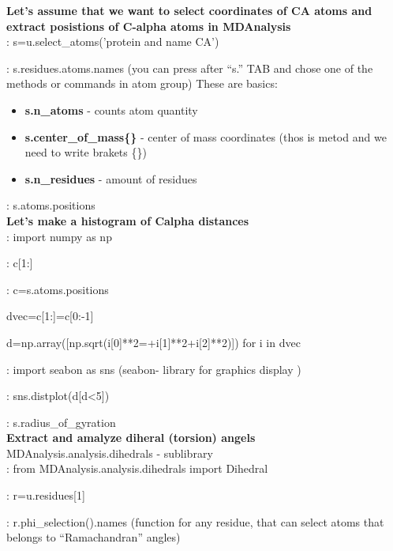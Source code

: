 \documentclass{article}
\begin{document}
    \textbf{Let's assume that we want to select coordinates of CA atoms and extract posistions of C-alpha atoms in MDAnalysis}\\
    
: s=u.select\_atoms('protein and name CA')

: s.residues.atoms.names (you can press after ``s.'' TAB and chose one of the methods{} or commands in atom group) 
  These are basics:
\begin{itemize}
    \item \textbf{s.n\_atoms} - counts atom quantity 

    \item \textbf{s.center\_of\_mass\{\}} - center of mass coordinates (thos is metod and we need to write brakets \{\})

    \item\textbf{s.n\_residues} - amount of residues

\end{itemize}

: s.atoms.positions \\


    \textbf{Let's make a histogram of Calpha distances} \\

: import numpy as np 

: c[1:]

: c=s.atoms.positions 

  dvec=c[1:]=c[0:-1] 
  
  d=np.array([np.sqrt(i[0]**2=+i[1]**2+i[2]**2)]) for i in dvec

: import seabon as sns          (seabon- library for graphics display )

: sns.distplot(d[d<5])

: s.radius\_of\_gyration \\


    \textbf{Extract and amalyze diheral (torsion) angels} \\

    MDAnalysis.analysis.dihedrals - sublibrary \\
    
    : from MDAnalysis.analysis.dihedrals import Dihedral
    
    : r=u.residues[1] 
    
    : r.phi\_selection().names       (function for any residue, that can select atoms that belongs to ``Ramachandran'' angles)
    
\end{document}
